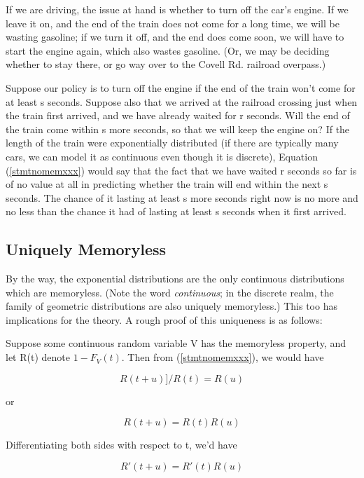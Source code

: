 If we are driving, the issue at hand is whether to turn off the car's
engine.  If we leave it on, and the end of the train does not come for a
long time, we will be wasting gasoline; if we turn it off, and the end
does come soon, we will have to start the engine again, which also
wastes gasoline.  (Or, we may be deciding whether to stay there, or go
way over to the Covell Rd. railroad overpass.)

Suppose our policy is to turn off the engine if the end of the train
won't come for at least s seconds. Suppose also that we arrived at the
railroad crossing just when the train first arrived, and we have already
waited for r seconds.  Will the end of the train come within s more
seconds, so that we will keep the engine on? If the length of the train
were exponentially distributed (if there are typically many cars, we can
model it as continuous even though it is discrete), Equation
(\ref{stmtnomemxxx}) would say that the fact that we have waited r seconds so
far is of no value at all in predicting whether the train will end
within the next s seconds. The chance of it lasting at least s more
seconds right now is no more and no less than the chance it had of
lasting at least s seconds when it first arrived.

\subsection{Uniquely Memoryless}

By the way, the exponential distributions are the only continuous
distributions which are memoryless.  (Note the word {\it continuous}; in
the discrete realm, the family of geometric distributions are also
uniquely memoryless.) This too has implications for the theory.  A rough
proof of this uniqueness is as follows:

Suppose some continuous random variable V has the memoryless property,
and let R(t) denote $1-F_V(t)$.  Then from (\ref{stmtnomemxxx}), we would
have 

\begin{equation}
R(t+u)]/R(t) = R(u)
\end{equation} 

or

\begin{equation}
R(t+u) = R(t) R(u)
\end{equation}

Differentiating both sides with respect to t, we'd have

\begin{equation}
R\prime(t+u) = R\prime(t) R(u)  
\end{equation}


